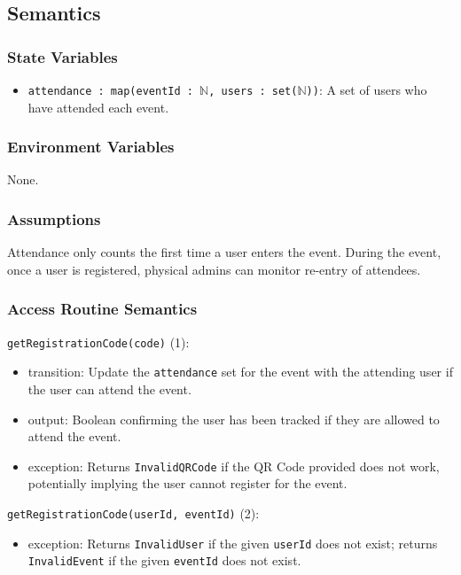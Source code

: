 \documentclass[12pt, titlepage]{article}
\begin{document}
\subsection{Semantics}

\subsubsection{State Variables}
\begin{itemize}
  \item \texttt{attendance : map(eventId : $\mathbb{N}$, users :
    set($\mathbb{N}$))}: A set of users who have attended each event.
\end{itemize}

\subsubsection{Environment Variables}
None.

\subsubsection{Assumptions}
Attendance only counts the first time a user enters the event. During the event, once a user is registered, physical
admins can monitor re-entry of attendees.

\subsubsection{Access Routine Semantics}

\noindent \texttt{getRegistrationCode(code)} (1):
\begin{itemize}
  \item transition: Update the \texttt{attendance} set for the event with the attending user if the user can attend the
    event.
  \item output: Boolean confirming the user has been tracked if they are allowed to attend the event.
\item exception: Returns \texttt{InvalidQRCode} if the QR Code provided does not work, potentially implying the user
  cannot register for the event.
\end{itemize}

\noindent \texttt{getRegistrationCode(userId, eventId)} (2):
\begin{itemize}
  \item exception: Returns \texttt{InvalidUser} if the given \texttt{userId} does not exist; returns
    \texttt{InvalidEvent} if the given \texttt{eventId} does not exist.
\end{itemize}
\end{document}
